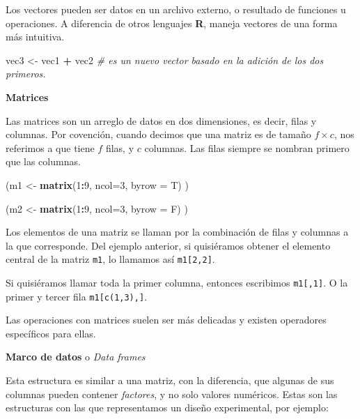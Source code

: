 \documentclass[12pt,letterpaper,]{book}
\newenvironment{Shaded}{\begin{snugshade}}{\end{snugshade}}
\newcommand{\KeywordTok}[1]{\textcolor[rgb]{0.13,0.29,0.53}{\textbf{#1}}}
\newcommand{\DataTypeTok}[1]{\textcolor[rgb]{0.13,0.29,0.53}{#1}}
\newcommand{\DecValTok}[1]{\textcolor[rgb]{0.00,0.00,0.81}{#1}}
\newcommand{\StringTok}[1]{\textcolor[rgb]{0.31,0.60,0.02}{#1}}
\newcommand{\CommentTok}[1]{\textcolor[rgb]{0.56,0.35,0.01}{\textit{#1}}}
\newcommand{\OperatorTok}[1]{\textcolor[rgb]{0.81,0.36,0.00}{\textbf{#1}}}
\newcommand{\NormalTok}[1]{#1}
\begin{document}
Los vectores pueden ser datos en un archivo externo, o resultado de
funciones u operaciones. A diferencia de otros lenguajes \textbf{R},
maneja vectores de una forma más intuitiva.

\begin{Shaded}
\begin{Highlighting}[]
\NormalTok{vec3 <-}\StringTok{ }\NormalTok{vec1 }\OperatorTok{+}\StringTok{ }\NormalTok{vec2 }\CommentTok{# es un nuevo vector basado en la adición de los dos primeros.}
\end{Highlighting}
\end{Shaded}

\textbf{Matrices}

Las matrices son un arreglo de datos en dos dimensiones, es decir, filas
y columnas. Por covención, cuando decimos que una matriz es de tamaño
\(f\times c\), nos referimos a que tiene \(f\) filas, y \(c\) columnas.
Las filas siempre se nombran primero que las columnas.

\begin{Shaded}
\begin{Highlighting}[]
\NormalTok{(m1 <-}\StringTok{ }\KeywordTok{matrix}\NormalTok{(}\DecValTok{1}\OperatorTok{:}\DecValTok{9}\NormalTok{, }\DataTypeTok{ncol=}\DecValTok{3}\NormalTok{, }\DataTypeTok{byrow =}\NormalTok{ T) )}

\NormalTok{(m2 <-}\StringTok{ }\KeywordTok{matrix}\NormalTok{(}\DecValTok{1}\OperatorTok{:}\DecValTok{9}\NormalTok{, }\DataTypeTok{ncol=}\DecValTok{3}\NormalTok{, }\DataTypeTok{byrow =}\NormalTok{ F) )}
\end{Highlighting}
\end{Shaded}

Los elementos de una matriz se llaman por la combinación de filas y
columnas a la que corresponde. Del ejemplo anterior, si quisiéramos
obtener el elemento central de la matriz \texttt{m1}, lo llamamos así
\texttt{m1{[}2,2{]}}.

Si quisiéramos llamar toda la primer columna, entonces escribimos
\texttt{m1{[},1{]}}. O la primer y tercer fila \texttt{m1{[}c(1,3),{]}}.

Las operaciones con matrices suelen ser más delicadas y existen
operadores específicos para ellas.

\textbf{Marco de datos} o \emph{Data frames}

Esta estructura es similar a una matriz, con la diferencia, que algunas
de sus columnas pueden contener \emph{factores}, y no solo valores
numéricos. Estas son las estructuras con las que representamos un diseño
experimental, por ejemplo:
\end{document}
